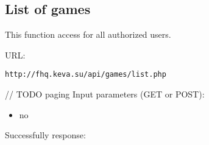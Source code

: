 \subsection{List of games}
\par

This function access for all authorized users.

URL:
\begin{Verbatim}[frame=single]
http://fhq.keva.su/api/games/list.php
\end{Verbatim}

// TODO paging
Input parameters (GET or POST):
\begin{itemize}
  \item no
\end{itemize}

Successfully response:  \\
